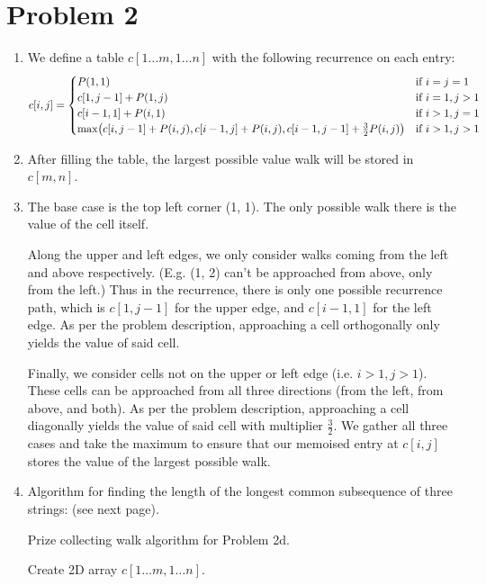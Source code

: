 \documentclass[12pt,a4paper]{article}
\begin{document}
\section*{Problem 2}
	\begin{enumerate}
		\item 
		We define a table $c[1 \dots m, 1 \dots n]$ with the following recurrence on each entry:
		\[
			c[i,j] = 
			\begin{cases}
				P(1, 1) & \text{if } i = j = 1 \\
				c[1,j-1] + P(1, j) & \text{if } i = 1, j > 1 \\
				c[i-1,1] + P(i, 1) & \text{if } i > 1, j = 1 \\
				\max\parens*{c[i,j-1] + P(i,j), c[i-1,j] + P(i,j), c[i-1,j-1] + \frac{3}{2}P(i,j)} & \text{if } i > 1, j > 1
			\end{cases}
		\]

		\item After filling the table, the largest possible value walk will be stored in $c[m,n]$.

		\item The base case is the top left corner (1, 1). The only possible walk there is the value of the cell itself.
		
		Along the upper and left edges, we only consider walks coming from the left and above respectively. (E.g. (1, 2) can't be approached from above, only from the left.) Thus in the recurrence, there is only one possible recurrence path, which is $c[1,j-1]$ for the upper edge, and $c[i-1,1]$ for the left edge. As per the problem description, approaching a cell orthogonally only yields the value of said cell.

		Finally, we consider cells not on the upper or left edge (i.e. $i > 1, j > 1$). These cells can be approached from all three directions (from the left, from above, and both). As per the problem description, approaching a cell diagonally yields the value of said cell with multiplier $\frac{3}{2}$. We gather all three cases and take the maximum to ensure that our memoised entry at $c[i,j]$ stores the value of the largest possible walk.

		\item Algorithm for finding the length of the longest common subsequence of three strings: (see next page).
		\begin{algorithm}[h!]
			\caption{Prize collecting walk algorithm for Problem 2d.}
			\begin{algorithmic}[1]
					\State Create 2D array $c[1 \dots m, 1 \dots n]$.
	

\end{algorithmic}
\end{algorithm}
\end{enumerate}
\end{document}
